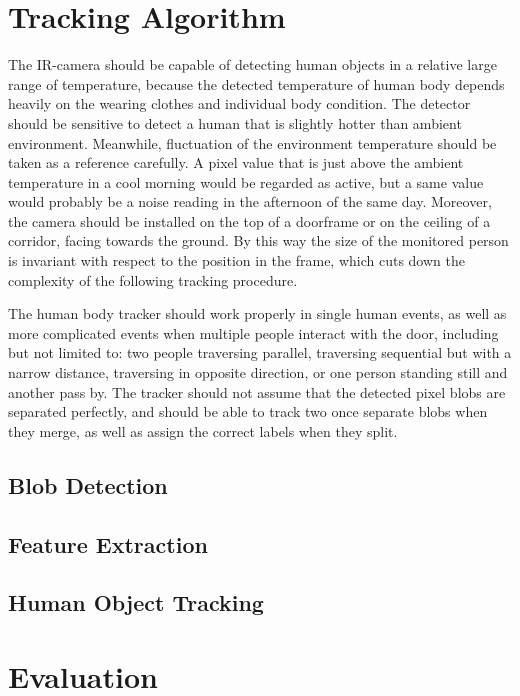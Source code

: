 \chapter{Tracking Algorithm}\label{ch:algorithm}
The IR-camera should be capable of detecting human objects in a relative large range of temperature, because the detected temperature of human body depends heavily on the wearing clothes and individual body condition. The detector should be sensitive to detect a human that is slightly hotter than ambient environment. Meanwhile, fluctuation of the environment temperature should be taken as a reference carefully. A pixel value that is just above the ambient temperature in a cool morning would be regarded as active, but a same value would probably be a noise reading in the afternoon of the same day.
Moreover, the camera should be installed on the top of a doorframe or on the ceiling of a corridor, facing towards the ground. By this way the size of the monitored person is invariant with respect to the position in the frame, which cuts down the complexity of the following tracking procedure.

The human body tracker should work properly in single human events, as well as more complicated events when multiple people interact with the door, including but not limited to: two people traversing parallel, traversing sequential but with a narrow distance, traversing in opposite direction, or one person standing still and another pass by. The tracker should not assume that the detected pixel blobs are separated perfectly, and should be able to track two once separate blobs when they merge, as well as assign the correct labels when they split.
\section{Blob Detection}
\section{Feature Extraction}
\section{Human Object Tracking}

\chapter{Evaluation} \label{ch:evaluation}
